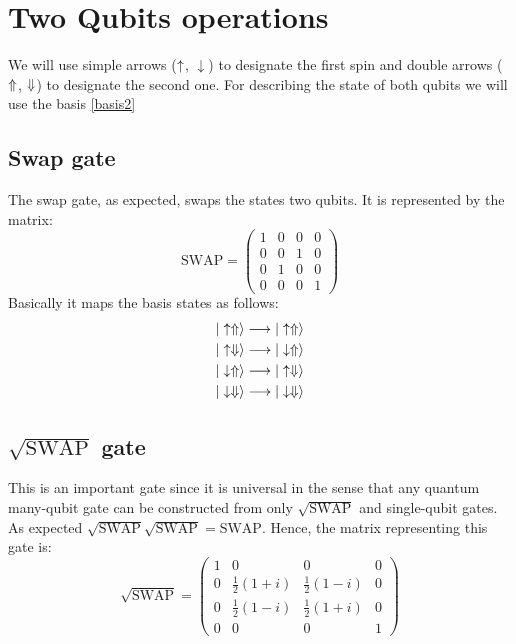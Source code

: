 \section{Two Qubits operations}
We will use simple arrows ($\uparrow$, $\downarrow$) to designate the first spin and double arrows ($\Uparrow$, $\Downarrow$) to designate the second one.
For describing the state of both qubits we will use the basis \eqref{basis2}


\subsection{Swap gate}
The swap gate, as expected, swaps the states two qubits. It is represented by the matrix:
\begin{equation}
  \text{SWAP} = \left(\begin{array}{cccc}
  1 & 0 & 0 & 0 \\
  0 & 0 & 1 & 0 \\
  0 & 1 & 0 & 0 \\
  0 & 0 & 0 & 1
  \end{array}\right)
\end{equation}
Basically it maps the basis states as follows:
\begin{equation}
  \begin{split}
    |\uparrow\Uparrow\rangle \longrightarrow |\uparrow\Uparrow\rangle\\
    |\uparrow\Downarrow\rangle \longrightarrow |\downarrow\Uparrow\rangle\\
    |\downarrow\Uparrow\rangle \longrightarrow |\uparrow\Downarrow\rangle\\
    |\downarrow\Downarrow\rangle \longrightarrow |\downarrow\Downarrow\rangle
  \end{split}
\end{equation}



\subsection{$\sqrt{\text{SWAP}}$ gate}
This is an important gate since it is universal in the sense that any quantum many-qubit gate can be constructed from only $\sqrt{\text{SWAP}}$ and single-qubit gates. As expected $\sqrt{\text{SWAP}}\sqrt{\text{SWAP}}=\text{SWAP}$. Hence, the matrix representing this gate is:
\begin{equation}
  \sqrt{\text{SWAP}} = \left(\begin{array}{cccc}
  1 & 0 & 0 & 0 \\
  0 & \frac{1}{2}(1+i) & \frac{1}{2}(1-i) & 0 \\
  0 & \frac{1}{2}(1-i) & \frac{1}{2}(1+i) & 0 \\
  0 & 0 & 0 & 1
  \end{array}\right)
\end{equation}

